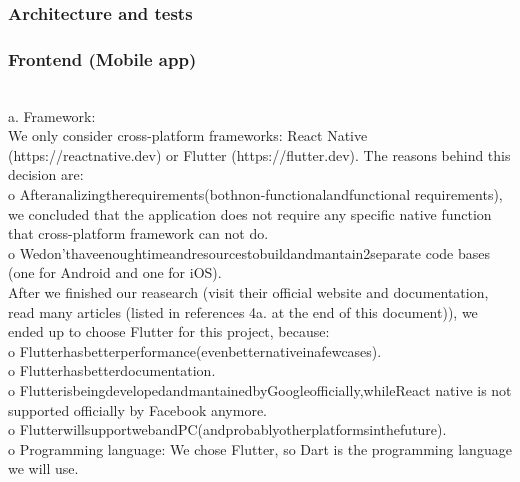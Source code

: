 \documentclass{article}
\begin{document}
\subsubsection{ Architecture and tests}
\subsubsection {Frontend (Mobile app) }
\\
a. Framework: \\
We only consider cross-platform frameworks: React Native (https://reactnative.dev) or Flutter (https://flutter.dev). The reasons behind this decision are: \\
o Afteranalizingtherequirements(bothnon-functionalandfunctional requirements), we concluded that the application does not require any specific native function that cross-platform framework can not do.\\
o Wedon’thaveenoughtimeandresourcestobuildandmantain2separate code bases (one for Android and one for iOS).\\
After we finished our reasearch (visit their official website and documentation, read many articles (listed in references 4a. at the end of this document)), we ended up to choose Flutter for this project, because:\\
o Flutterhasbetterperformance(evenbetternativeinafewcases).\\
o Flutterhasbetterdocumentation. \\
o FlutterisbeingdevelopedandmantainedbyGoogleofficially,whileReact native is not supported officially by Facebook anymore. \\
o FlutterwillsupportwebandPC(andprobablyotherplatformsinthefuture). \\
o Programming language: We chose Flutter, so Dart is the programming language we will use. \\
\end{document}
